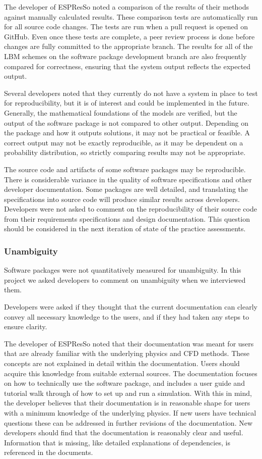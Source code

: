 \documentclass[12pt, notitlepage]{article}
\begin{document}
The developer of ESPResSo noted a comparison of the results of their methods against manually calculated results. These comparison tests are automatically run for all source code changes. The tests are run when a pull request is opened on GitHub. Even once these tests are complete, a peer review process is done before changes are fully committed to the appropriate branch. The results for all of the LBM schemes on the software package development branch are also frequently compared for correctness, ensuring that the system output reflects the expected output.  

Several developers noted that they currently do not have a system in place to test for reproducibility, but it is of interest and could be implemented in the future. Generally, the mathematical foundations of the models are verified, but the output of the software package is not compared to other output. Depending on the package and how it outputs solutions, it may not be practical or feasible. A correct output may not be exactly reproducible, as it may be dependent on a probability distribution, so strictly comparing results may not be appropriate. 

The source code and artifacts of some software packages may be reproducible. There is considerable variance in the quality of software specifications and other developer documentation. Some packages are well detailed, and translating the specifications into source code will produce similar results across developers. Developers were not asked to comment on the reproducibility of their source code from their requirements specifications and design documentation. This question should be considered in the next iteration of state of the practice assessments. 

\subsubsection{Unambiguity}

Software packages were not quantitatively measured for unambiguity.
In this project we asked developers to comment on unambiguity when we interviewed them.

Developers were asked if they thought that the current documentation can clearly convey all necessary knowledge to the users, and if they had taken any steps to ensure clarity. 

The developer of ESPResSo noted that their documentation was meant for users that are already familiar with the underlying physics and CFD methods. These concepts are not explained in detail within the documentation. Users should acquire this knowledge from suitable external sources. The documentation focuses on how to technically use the software package, and includes a user guide and tutorial walk through of how to set up and run a simulation. With this in mind, the developer believes that their documentation is in reasonable shape for users with a minimum knowledge of the underlying physics. If new users have technical questions these can be addressed in further revisions of the documentation. New developers should find that the documentation is reasonably clear and useful. Information that is missing, like detailed explanations of dependencies, is referenced in the documents. 
\end{document}
